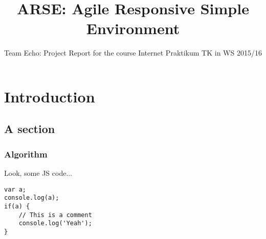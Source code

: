 \documentclass[
	accentcolor=tud1a %
]{tudreport}
\begin{document}
\title{ARSE: Agile Responsive Simple Environment}
\subtitle{Team Echo: Project Report for the course Internet Praktikum TK in WS 2015/16}

\maketitle

\tableofcontents

\chapter{Introduction}
\label{ch:introduction}

\blindtext

\section{A section}
\label{sec:section}


\subsection{Algorithm}
\label{sec:section_algo}

Look, some JS code...

\begin{lstlisting}[float,caption=Code Example,label=l:code_example]
var a;
console.log(a);
if(a) {
	// This is a comment
	console.log('Yeah');
}
\end{lstlisting}



\end{document}
